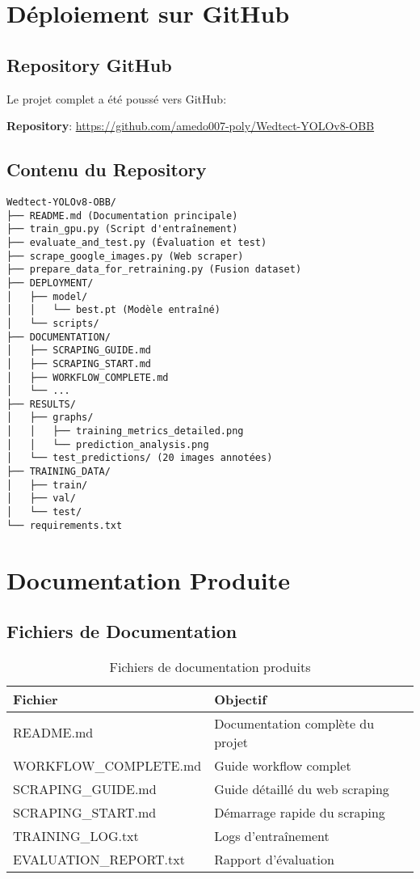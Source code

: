 \documentclass[a4paper,12pt]{report}
\begin{document}
\section{Déploiement sur GitHub}

\subsection{Repository GitHub}

Le projet complet a été poussé vers GitHub:

\begin{center}
\textbf{Repository}: \url{https://github.com/amedo007-poly/Wedtect-YOLOv8-OBB}
\end{center}

\subsection{Contenu du Repository}

\begin{lstlisting}
Wedtect-YOLOv8-OBB/
├── README.md (Documentation principale)
├── train_gpu.py (Script d'entraînement)
├── evaluate_and_test.py (Évaluation et test)
├── scrape_google_images.py (Web scraper)
├── prepare_data_for_retraining.py (Fusion dataset)
├── DEPLOYMENT/
│   ├── model/
│   │   └── best.pt (Modèle entraîné)
│   └── scripts/
├── DOCUMENTATION/
│   ├── SCRAPING_GUIDE.md
│   ├── SCRAPING_START.md
│   ├── WORKFLOW_COMPLETE.md
│   └── ...
├── RESULTS/
│   ├── graphs/
│   │   ├── training_metrics_detailed.png
│   │   └── prediction_analysis.png
│   └── test_predictions/ (20 images annotées)
├── TRAINING_DATA/
│   ├── train/
│   ├── val/
│   └── test/
└── requirements.txt
\end{lstlisting}

\section{Documentation Produite}

\subsection{Fichiers de Documentation}

\begin{table}[H]
    \centering
    \begin{tabular}{|l|l|}
    \hline
    \textbf{Fichier} & \textbf{Objectif} \\
    \hline
    README.md & Documentation complète du projet \\
    \hline
    WORKFLOW\_COMPLETE.md & Guide workflow complet \\
    \hline
    SCRAPING\_GUIDE.md & Guide détaillé du web scraping \\
    \hline
    SCRAPING\_START.md & Démarrage rapide du scraping \\
    \hline
    TRAINING\_LOG.txt & Logs d'entraînement \\
    \hline
    EVALUATION\_REPORT.txt & Rapport d'évaluation \\
    \hline
    \end{tabular}
    \caption{Fichiers de documentation produits}
\end{table}
\end{document}
